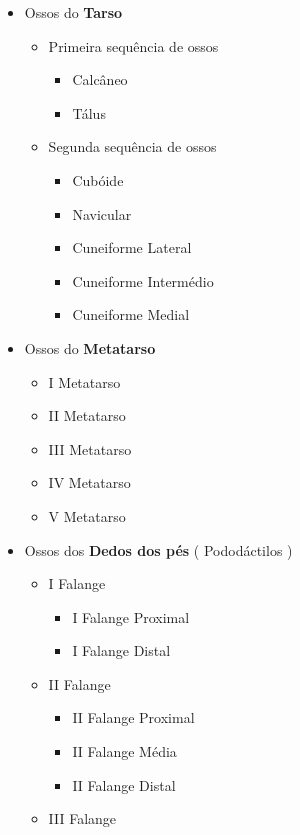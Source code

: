 \documentclass[
]{book}
\providecommand{\tightlist}{%
  \setlength{\itemsep}{0pt}\setlength{\parskip}{0pt}}
\begin{document}
\begin{itemize}
\tightlist
\item
  Ossos do \textbf{Tarso}

  \begin{itemize}
  \tightlist
  \item
    Primeira sequência de ossos

    \begin{itemize}
    \tightlist
    \item
      Calcâneo
    \item
      Tálus
    \end{itemize}
  \item
    Segunda sequência de ossos

    \begin{itemize}
    \tightlist
    \item
      Cubóide
    \item
      Navicular
    \item
      Cuneiforme Lateral
    \item
      Cuneiforme Intermédio
    \item
      Cuneiforme Medial
    \end{itemize}
  \end{itemize}
\item
  Ossos do \textbf{Metatarso}

  \begin{itemize}
  \tightlist
  \item
    I Metatarso
  \item
    II Metatarso
  \item
    III Metatarso
  \item
    IV Metatarso
  \item
    V Metatarso
  \end{itemize}
\item
  Ossos dos \textbf{Dedos dos pés} ( Pododáctilos )

  \begin{itemize}
  \tightlist
  \item
    I Falange

    \begin{itemize}
    \tightlist
    \item
      I Falange Proximal
    \item
      I Falange Distal
    \end{itemize}
  \item
    II Falange

    \begin{itemize}
    \tightlist
    \item
      II Falange Proximal
    \item
      II Falange Média
    \item
      II Falange Distal
    \end{itemize}
  \item
    III Falange


\end{itemize}
\end{itemize}
\end{document}
